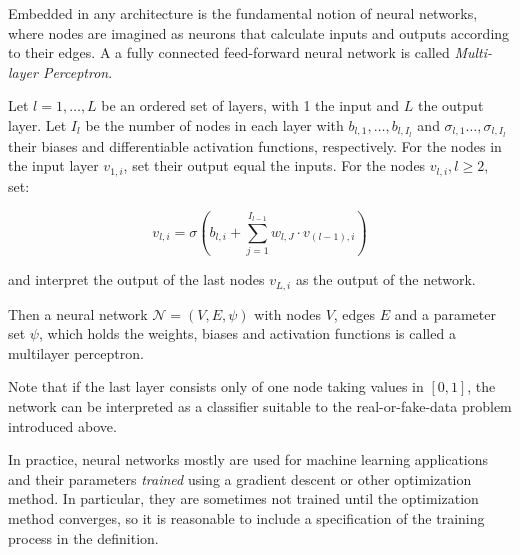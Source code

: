 Embedded in any architecture is the fundamental notion of neural networks, where nodes are imagined as neurons that calculate inputs and outputs according to their edges.
A a fully connected feed-forward neural network is called \textit{Multi-layer Perceptron}.

\begin{definition}
    Let $l = 1, \ldots, L$ be an ordered set of layers, with 1 the input and $L$ the output layer.
    Let $I_l$ be the number of nodes in each layer with $b_{l,1}, \ldots, b_{l,I_l}$ and $\sigma_{l,1} \ldots, \sigma_{l,I_l}$ their biases and differentiable activation functions, respectively.
    For the nodes in the input layer $v_{1,i}$, set their output equal the inputs.
    For the nodes $v_{l,i}, l \geq 2$, set:

    \begin{equation}
        v_{l,i} = \sigma (b_{l,i} + \sum_{j = 1}^{I_{l-1}} w_{l,J} \cdot v_{(l-1),i})
    \end{equation}

    and interpret the output of the last nodes $v_{L,i}$ as the output of the network.

    Then a neural network $\mathcal{N} = (V, E, \psi)$ 
    with nodes $V$, edges $E$ and a parameter set $\psi$, which holds the weights, biases and activation functions%
    is called a multilayer perceptron.
\end{definition}

Note that if the last layer consists only of one node taking values in $[0,1]$, the network can be interpreted as a classifier suitable to the real-or-fake-data problem introduced above.

In practice, neural networks mostly are used for machine learning applications and their parameters \textit{trained} using a gradient descent or other optimization method.
In particular, they are sometimes not trained until the optimization method converges, so it is reasonable to include a specification of the training process in the definition.

